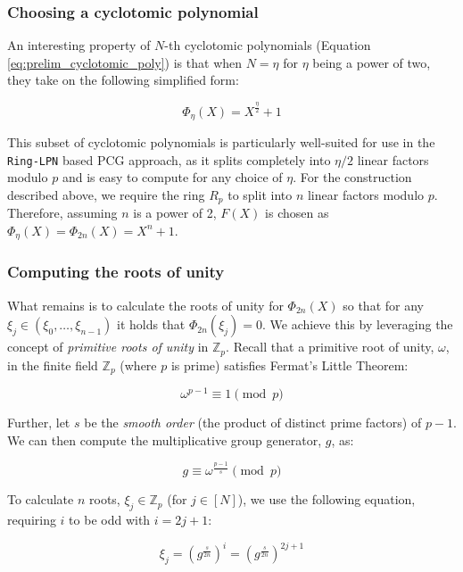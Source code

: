 \subsubsection{Choosing a cyclotomic polynomial}
An interesting property of $N$-th cyclotomic polynomials (Equation \ref{eq:prelim_cyclotomic_poly}) is that when $N=\eta$ for $\eta$ being a power of two, they take on the following simplified form:

\begin{equation}
\label{eq:choosingfx}
\Phi_\eta(X)= X^\frac{\eta}{2} + 1
\end{equation}

This subset of cyclotomic polynomials is particularly well-suited for use in the \texttt{Ring-LPN} based PCG approach, as it splits completely into $\eta/2$ linear factors modulo $p$ and is easy to compute for any choice of $\eta$. For the construction described above, we require the ring $R_p$ to split into $n$ linear factors modulo $p$. Therefore, assuming $n$ is a power of 2, $F(X)$ is chosen as $\Phi_\eta(X) = \Phi_{2n}(X) = X^n + 1$.


\subsubsection{Computing the roots of unity}
What remains is to calculate the roots of unity for $\Phi_{2n}(X)$ so that for any $\xi_j \in (\xi_0, \ldots, \xi_{n-1})$ it holds that $\Phi_{2n}(\xi_j) = 0$. We achieve this by leveraging the concept of \textit{primitive roots of unity} in $\mathbb{Z}_p$. Recall that a primitive root of unity, $\omega$, in the finite field  $\mathbb{Z}_p$ (where $p$ is prime) satisfies Fermat's Little Theorem:

\begin{equation}
\label{eq:fermatLT}
\omega^{p-1} \equiv 1 \pmod{p}
\end{equation}

Further, let $s$ be the \textit{smooth order} (the product of distinct prime factors) of $p-1$.  We can then compute the multiplicative group generator, $g$, as:

\begin{equation}
g \equiv \omega^{\frac{p-1}{s}} \pmod{p}
\label{eq:multGroupGen}
\end{equation}

To calculate $n$ roots, $\xi_j \in \mathbb{Z}_p$ (for $j \in [N]$), we use the following equation, requiring $i$ to be odd with $i=2j+1$:

\begin{equation}
\label{eq:root_main_equasion}
\xi_j = \left(g^{\frac{s}{2n}}\right)^{i} = \left(g^{\frac{s}{2n}}\right)^{2j+1}
\end{equation}


